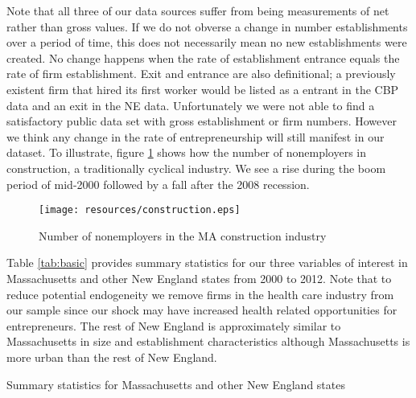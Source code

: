 \documentclass[12pt]{article}
\begin{document}
Note that all three of our data sources suffer from being measurements of net rather than gross values. If  we do not obverse a change in number establishments over a period of time, this does not necessarily mean no new establishments were created. No change happens when the rate of establishment entrance equals the rate of firm establishment. Exit and entrance are also definitional; a previously existent firm that hired its first worker would be listed as a entrant in the CBP data and an exit in the NE data. Unfortunately we were not able to find a satisfactory public data set with gross establishment or firm numbers. However we think any change in the rate of entrepreneurship will still manifest in our dataset. To illustrate, figure \ref{fig:construct} shows how the number of nonemployers in construction, a traditionally cyclical industry. We see a rise during the boom period of mid-2000 followed by a fall after the 2008 recession. 

\begin{figure}[H]
	\centering
	\texttt{[image: resources/construction.eps]}
	\caption{Number of nonemployers in the MA construction industry}
	\label{fig:construct}
\end{figure}

Table \ref{tab:basic} provides summary statistics for our three variables of interest in Massachusetts and other New England states from 2000 to 2012. Note that to reduce potential endogeneity we remove firms in the health care industry from our sample since our shock may have increased health related opportunities for entrepreneurs. The rest of New England is approximately similar to Massachusetts in size and establishment characteristics although Massachusetts is more urban than the rest of New England. 

\begin{table}[H]
	\centering
	\caption{Summary statistics for Massachusetts and other New England states}
	
	\label{tab:basic}
\end{table}
\end{document}
